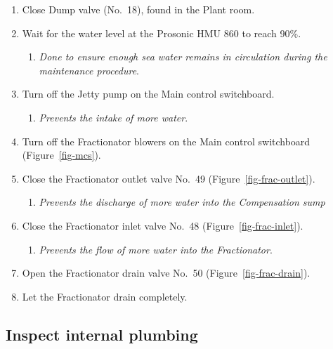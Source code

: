 \documentclass[
  12pt,
]{report}
\providecommand{\tightlist}{%
  \setlength{\itemsep}{0pt}\setlength{\parskip}{0pt}}\usepackage{longtable,booktabs,array}
\begin{document}
\begin{enumerate}
\def\labelenumi{\arabic{enumi}.}
\tightlist
\item
  Close Dump valve (No.~18), found in the Plant room.
\item
  Wait for the water level at the Prosonic HMU 860 to reach 90\%.

  \begin{enumerate}
  \def\labelenumii{\roman{enumii})}
  \tightlist
  \item
    \emph{Done to ensure enough sea water remains in circulation during
    the maintenance procedure}.
  \end{enumerate}
\item
  Turn off the Jetty pump on the Main control switchboard.

  \begin{enumerate}
  \def\labelenumii{\roman{enumii})}
  \tightlist
  \item
    \emph{Prevents the intake of more water}.
  \end{enumerate}
\item
  Turn off the Fractionator blowers on the Main control switchboard
  (Figure~\ref{fig-mcs}).
\item
  Close the Fractionator outlet valve No.~49
  (Figure~\ref{fig-frac-outlet}).

  \begin{enumerate}
  \def\labelenumii{\roman{enumii})}
  \tightlist
  \item
    \emph{Prevents the discharge of more water into the Compensation
    sump}
  \end{enumerate}
\item
  Close the Fractionator inlet valve No.~48
  (Figure~\ref{fig-frac-inlet}).

  \begin{enumerate}
  \def\labelenumii{\roman{enumii})}
  \tightlist
  \item
    \emph{Prevents the flow of more water into the Fractionator}.
  \end{enumerate}
\item
  Open the Fractionator drain valve No.~50
  (Figure~\ref{fig-frac-drain}).
\item
  Let the Fractionator drain completely.
\end{enumerate}

\hypertarget{inspect-internal-plumbing}{%
\subsection{Inspect internal plumbing}\label{inspect-internal-plumbing}}
\end{document}
